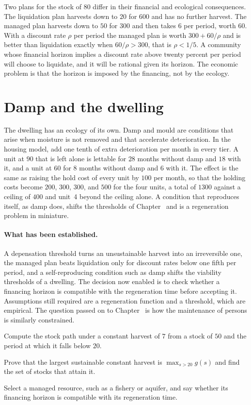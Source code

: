 Two plans for the stock of $80$ differ in their financial and ecological consequences. The liquidation plan harvests down to $20$ for $600$ and has no further harvest. The managed plan harvests down to $50$ for $300$ and then takes $6$ per period, worth $60$. With a discount rate $\rho$ per period the managed plan is worth $300+60/\rho$ and is better than liquidation exactly when $60/\rho>300$, that is $\rho<1/5$. A community whose financial horizon implies a discount rate above twenty percent per period will choose to liquidate, and it will be rational given its horizon. The economic problem is that the horizon is imposed by the financing, not by the ecology.

\section{Damp and the dwelling}

The dwelling has an ecology of its own. Damp and mould are conditions that arise when moisture is not removed and that accelerate deterioration. In the housing model, add one tenth of extra deterioration per month in every tier. A unit at $90$ that is left alone is lettable for $28$ months without damp and $18$ with it, and a unit at $60$ for $8$ months without damp and $6$ with it. The effect is the same as raising the hold cost of every unit by $100$ per month, so that the holding costs become $200$, $300$, $300$, and $500$ for the four units, a total of $1300$ against a ceiling of $400$ and unit~4 beyond the ceiling alone. A condition that reproduces itself, as damp does, shifts the thresholds of Chapter~ and is a regeneration problem in miniature.

\paragraph{What has been established.} A depensation threshold turns an unsustainable harvest into an irreversible one, the managed plan beats liquidation only for discount rates below one fifth per period, and a self-reproducing condition such as damp shifts the viability thresholds of a dwelling. The decision now enabled is to check whether a financing horizon is compatible with the regeneration time before accepting it. Assumptions still required are a regeneration function and a threshold, which are empirical. The question passed on to Chapter~ is how the maintenance of persons is similarly constrained.

\begin{exercise}
Compute the stock path under a constant harvest of $7$ from a stock of $50$ and the period at which it falls below $20$.
\end{exercise}
\begin{exercise}
Prove that the largest sustainable constant harvest is $\max_{s>20}g(s)$ and find the set of stocks that attain it.
\end{exercise}
\begin{exercise}
Select a managed resource, such as a fishery or aquifer, and say whether its financing horizon is compatible with its regeneration time.
\end{exercise}

